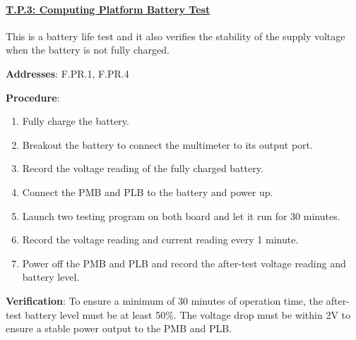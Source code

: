 \paragraph{\underline{T.P.3: Computing Platform Battery Test}}

This is a battery life test and it also verifies the stability of the supply voltage when the battery is not fully charged.

\textbf{Addresses}: F.PR.1, F.PR.4

\textbf{Procedure}:
\begin{enumerate}[noitemsep]
    \item Fully charge the battery.
    \item Breakout the battery to connect the multimeter to its output port.
    \item Record the voltage reading of the fully charged battery. 
    \item Connect the PMB and PLB to the battery and power up.
    \item Launch two testing program on both board and let it run for 30 minutes.
    \item Record the voltage reading and current reading every 1 minute.
    \item Power off the PMB and PLB and record the after-test voltage reading and battery level.
\end{enumerate}

\textbf{Verification}: 
To ensure a minimum of 30 minutes of operation time, the after-test battery level must be at least 50\%. The voltage drop must be within 2V to ensure a stable power output to the PMB and PLB.